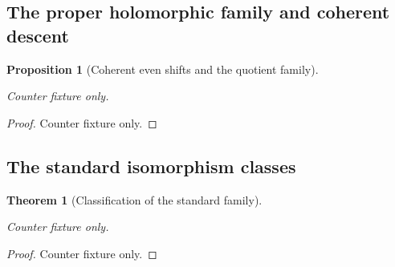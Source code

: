 \documentclass{article}
\newtheorem{theorem}{Theorem}[section]
\newtheorem{proposition}[proposition]{Proposition}
\begin{document}
\setcounter{section}{7}
\setcounter{subsection}{1}
\setcounter{theorem}{4}
\subsection{The proper holomorphic family and coherent descent}\hypertarget{tag-01PC}{}\label{fam:section:A.3}\label{I:coherent-descent-proof}

\begin{proposition}[Coherent even shifts and the quotient family]\hypertarget{tag-01Q2}{}\label{fam:src:A.3.1}\label{fam:st:A.3.1}
Counter fixture only.
\end{proposition}
\begin{proof}Counter fixture only.\end{proof}
\setcounter{subsection}{3}
\setcounter{theorem}{7}
\subsection{The standard isomorphism classes}\hypertarget{tag-01PE}{}\label{fam:section:A.5}
\begin{theorem}[Classification of the standard family]\hypertarget{tag-01Q6}{}\label{fam:src:A.5.1}\label{fam:st:A.5.1}\label{wb:pshift:thm:classification}
Counter fixture only.
\end{theorem}
\hypertarget{tag-000C}{}\label{app:rederive:fam-src-A.5.1}
\begin{proof}Counter fixture only.\end{proof}
\end{document}
